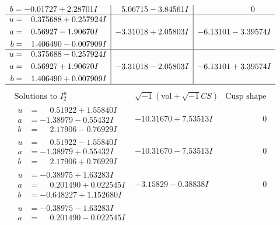 \documentclass[1p]{elsarticle_modified}
\theoremstyle{definition}
\newcommand{\I}{\sqrt{-1}}
\begin{document}
$$\begin{array}{c|c|c}
\begin{aligned}
b &= -0.01727 + 2.28701 I\end{aligned}
 & \phantom{-}5.06715 - 3.84561 I & \phantom{-0.000000 } 0 \\ \hline\begin{aligned}
u &= \phantom{-}0.375688 + 0.257924 I \\
a &= \phantom{-}0.56927 - 1.90670 I \\
b &= \phantom{-}1.406490 - 0.007909 I\end{aligned}
 & -3.31018 + 2.05803 I & -6.13101 - 3.39574 I \\ \hline\begin{aligned}
u &= \phantom{-}0.375688 - 0.257924 I \\
a &= \phantom{-}0.56927 + 1.90670 I \\
b &= \phantom{-}1.406490 + 0.007909 I\end{aligned}
 & -3.31018 - 2.05803 I & -6.13101 + 3.39574 I\\
 \hline 
 \end{array}$$\newpage$$\begin{array}{c|c|c}  
\text{Solutions to }I^u_{2}& \I (\text{vol} + \sqrt{-1}CS) & \text{Cusp shape}\\
 \hline 
\begin{aligned}
u &= \phantom{-}0.51922 + 1.55840 I \\
a &= -1.38979 - 0.55432 I \\
b &= \phantom{-}2.17906 - 0.76929 I\end{aligned}
 & -10.31670 + 7.53513 I & \phantom{-0.000000 } 0 \\ \hline\begin{aligned}
u &= \phantom{-}0.51922 - 1.55840 I \\
a &= -1.38979 + 0.55432 I \\
b &= \phantom{-}2.17906 + 0.76929 I\end{aligned}
 & -10.31670 - 7.53513 I & \phantom{-0.000000 } 0 \\ \hline\begin{aligned}
u &= -0.38975 + 1.63283 I \\
a &= \phantom{-}0.201490 + 0.022545 I \\
b &= -0.648227 + 1.152680 I\end{aligned}
 & -3.15829 - 0.38838 I & \phantom{-0.000000 } 0 \\ \hline\begin{aligned}
u &= -0.38975 - 1.63283 I \\
a &= \phantom{-}0.201490 - 0.022545 I \\

\end{aligned}
\end{array}$$
\end{document}
